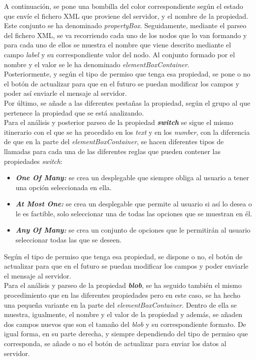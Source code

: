 A continuación, se pone una bombilla del color correspondiente según el estado que envíe el fichero XML que proviene del servidor, y el nombre de la propiedad. Este conjunto se ha denominado \textit{propertyBox}.
Seguidamente, mediante el parseo del fichero XML, se va recorriendo cada uno de los nodos que lo van formando y para cada uno de ellos se muestra el nombre que viene descrito mediante el campo \textit{label} y su correspondiente valor del nodo. Al conjunto formado por el nombre y el valor se le ha denominado \textit{elementBoxContainer}.\\

Posteriormente, y según el tipo de permiso que tenga esa propiedad, se pone o no el botón de actualizar para que en el futuro se puedan modificar los campos y poder así enviarle el mensaje al servidor.\\

Por último, se añade a las diferentes pestañas la propiedad, según el grupo al que pertenece la propiedad que se está analizando.\\

Para el análisis y posterior parseo de la propiedad \textbf{\textit{switch}} se sigue el mismo itinerario con el que se ha procedido en los \textit{text} y en los \textit{number}, con la diferencia de que en la parte del \textit{elementBoxContainer}, se hacen diferentes tipos de llamadas para cada una de las diferentes reglas  que pueden contener las propiedades \textit{switch}:
\begin{itemize}
  \item \textbf{\textit{One Of Many:}} se crea un desplegable que siempre obliga al usuario a tener una opción seleccionada en ella.
  \item \textbf{\textit{At Most One:}} se crea un desplegable que permite al usuario si así lo desea o le es factible, solo seleccionar una de todas las opciones que se muestran en él.
  \item \textbf{\textit{Any Of Many:}} se crea un conjunto de opciones que le permitirán al usuario seleccionar todas las que se deseen.
\end{itemize}
Según el tipo de permiso que tenga esa propiedad, se dispone o no, el botón de actualizar para que en el futuro se puedan modificar los campos y poder enviarle el mensaje al servidor.\\

Para el análisis y parseo de la propiedad \textbf{\textit{blob}}, se ha seguido también el mismo procedimiento que en las diferentes propiedades pero en este caso, se ha hecho una pequeña variante en la parte del \textit{elementBoxContainer}. Dentro de ella se muestra, igualmente, el nombre y el valor de la propiedad y además, se añaden dos campos nuevos que son el tamaño del \textit{blob} y su correspondiente formato.
De igual forma, en su parte derecha, y siempre dependiendo  del tipo de permiso que corresponda, se añade o no el botón de actualizar para enviar los datos al servidor.\\

